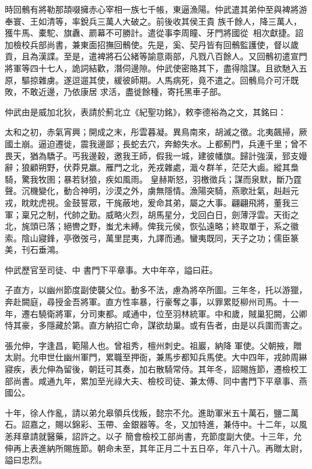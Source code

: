 \begin{pinyinscope}
 時回鶻有將勒那頡啜擁赤心宰相一族七千帳，東逼漁陽。仲武遣其弟仲至與裨將游奉寰、王如清等，率銳兵三萬人大破之。前後收其侯王貴
 族千餘人，降三萬人，獲牛馬、橐駝、旗纛、罽幕不可勝計。遣從事李周瞳、牙門將國從，相次獻捷。詔加檢校兵部尚書，兼東面招撫回鶻使。先是，奚、契丹皆有回鶻監護使，督以歲貢，且為漢諜。至是，遣裨將石公緒等諭意兩部，凡戮八百餘人。又回鶻初遣宣門將軍等四十七人，詭詞結歡，潛伺邊隙。仲武使密賂其下，盡得陰謀。且欲馳入五原，驅掠雜虜。遂逗遛其使，緩彼師期。人馬病死，竟不遣之。回鶻烏介可汗既敗，不敢近邊，乃依康居
 求活，盡徙餘種，寄托黑車子部。



 仲武由是威加北狄，表請於薊北立《紀聖功銘》，敕李德裕為之文，其銘曰：



 太和之初，赤氣宵興；開成之末，彤雲暮凝。異鳥南來，胡滅之徵。北夷飆掃，厥國土崩。逼迫遷徙，震我邊鄙；長蛇去穴，奔鯨失水。上都薊門，兵連千里；曾不畏天，猶為驕子。丐我邊穀，邀我王師，假我一城，建彼幡旗。歸計強漢，郅支嫚辭；狼顧朔野，伏莽見羸。雁門之北，羌戎雜處，濈々群羊，茫茫大鹵。縱其梟騎，驚我牧圉；暴若豺狼，疾如風雨。
 皇赫斯怒，羽檄徵兵；謀而泉默，斷乃霆聲。沉機變化，動合神明，沙漠之外，虜無隱情。漁陽突騎，燕歌壯氣，赳赳元戎，眈眈虎視。金鼓誓眾，干旄蔽地，爰命其弟，屬之大事。翩翩飛將，董我三軍；稟兄之制，代帥之勤。威略火烈，胡馬星分，戈回白日，劍薄浮雲。天街之北，旄頭已落；絕轡之野，蚩尤未縛。俾我元侯，恢弘遠略；終取單于，系之徽索。陰山寢鋒，亭徼弢弓，萬里昆夷，九譯而通。蠻夷既同，天子之功；儒臣篆美，刊石垂鴻。



 仲武歷官至司徒、中
 書門下平章事。大中年卒，謚曰莊。



 子直方，以幽州節度副使襲父位。動多不法，慮為將卒所圖。三年冬，托以游獵，奔赴闕庭，尋授金吾將軍。直方性率暴，行豪奪之事，以罪累貶柳州司馬。十一年，遷右驍衛將軍，分司東都。咸通中，位至羽林統軍。中和歲，賊巢犯闕，公卿恃其豪，多隱藏於第。直方納招亡命，謀欲劫巢。或有告者，由是以兵圍而害之。



 張允伸，字逢昌，範陽人也。曾祖秀，檀州刺史。祖巖，納降
 軍使。父朝掖，贈太尉。允申世仕幽州軍門，累職至押衙，兼馬步都知兵馬使。大中四年，戎帥周綝寢疾，表允伸為留後，朝廷可其奏，加右散騎常侍。其年冬，詔賜旌節，遷檢校工部尚書。咸通九年，累加至光祿大夫、檢校司徒、兼太傅、同中書門下平章事、燕國公。



 十年，徐人作亂，請以弟允皋領兵伐叛，懿宗不允。進助軍米五十萬石，鹽二萬石。詔嘉之，賜以錦彩、玉帶、金銀器等。冬，又加特進，兼侍中。十二年，以風恙拜章請就醫藥，詔許之。以子
 簡會檢校工部尚書，充節度副大使。十三年，允伸再上表進納所賜旌節。朝命未至，其年正月二十五日卒，年八十八。再贈太尉，謚曰忠烈。




\end{pinyinscope}
